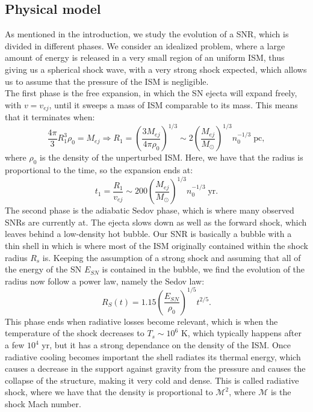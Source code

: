 \documentclass{article}
\begin{document}
\subsection{Physical model}
As mentioned in the introduction, we study the evolution of a SNR, which is divided in different phases. We consider an idealized problem, where a large amount of energy is released in a very small region of an uniform ISM, thus giving us a spherical shock wave, with a very strong shock expected, which allows us to assume that the pressure of the ISM is negligible. \\
The first phase is the free expansion, in which the SN ejecta will expand freely, with $v=v_{ej}$, until it sweeps a mass of ISM comparable to its mass. This means that it terminates when:
\begin{equation}
	\frac{4\pi }{3}R_{1}^{3}\rho_0=M_{ej} \Longrightarrow R_1=\left(\frac{3M_{ej}}{4\pi \rho_0}\right)^{1/3}\sim 2\left(\frac{M_{ej}}{M_{\odot}}\right)^ {1/3}n_0^{-1/3}\; \text{pc},
\end{equation}
where $\rho_0$ is the density of the unperturbed ISM.
Here, we have that the radius is proportional to the time, so the expansion ends at:
\begin{equation}
	t_1=\frac{R_1}{v_{ej}}\sim 200 \left(\frac{M_{ej}}{M_{\odot}}\right)^{1/3}n_0^ {-1/3} \; \text{yr}.
\end{equation}
The second phase is the adiabatic Sedov phase, which is where many observed SNRs are currently at. The ejecta slows down as well as the forward shock, which leaves behind a low-density hot bubble.
Our SNR is basically a bubble with a thin shell in which is where most of the ISM originally contained within the shock radius $R_s$ is. Keeping the assumption of a strong shock and assuming that all of the energy of the SN $E_{SN}$ is contained in the bubble, we find the evolution of the radius now follow a power law, namely the Sedov law:
\begin{equation}
	R_S(t)=1.15\left(\frac{E_{SN}}{\rho_0}\right)^{1/5}t^{2/5}.
\end{equation}
This phase ends when radiative losses become relevant, which is when the temperature of the shock decreases to $T_s\sim10^{6}$ K, which typically happens after a few $10^{4}$ yr, but it has a strong dependance on the density of the ISM. Once radiative cooling becomes important the shell radiates its thermal energy, which causes a decrease in the support against gravity from the pressure and causes the collapse of the structure, making it very cold and dense. This is called radiative shock, where we have that the density is proportional to $\mathcal{M}^2$, where $\mathcal{M}$ is the shock Mach number.
\end{document}
